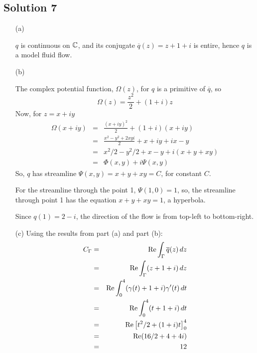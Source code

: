 \subsection*{Solution 7}

\begin{itemize}
\item[(a)]

$q$ is continuous on $\mathbb{C}$, and its conjugate
$\overline{q}(z) = z+1+i$
is entire, hence $q$ is a model fluid flow.

\item[(b)]

The complex potential function, $\Omega(z)$, for $q$ is a primitive of
$\overline{q}$, so
\[
\Omega(z) = \frac{z^2}{2}+(1+i)z
\]
Now, for $z=x+iy$
\begin{eqnarray*}
\Omega(x+iy)
	&=& \frac{ (x+iy)^2 }{ 2 } + (1+i)(x+iy) \\
	&=& \frac{ x^2-y^2 +2xyi }{2} + x + iy + ix - y \\
	&=& x^2/2 - y^2/2 + x - y + i(x + y + xy) \\
	&=& \Phi(x,y) + i\Psi(x,y)
\end{eqnarray*}
So, $q$ has streamline $\Psi(x,y)=x+y+xy=C$, for constant $C$.

For the streamline through the point 1, $\Psi(1,0) = 1$, so, the
streamline through point 1 has the equation $x+y+xy=1$, a hyperbola.



Since $q(1)=2-i$, the direction of the flow is from top-left to
bottom-right.

\item[(c)]
Using the results from part (a) and part (b):
\begin{eqnarray*}
C_\Gamma
	&=& {\rm Re} \int_\Gamma \overline{q}(z)\,dz \\
	&=& {\rm Re} \int_\Gamma (z+1+i)\,dz \\
	&=& {\rm Re} \int_0^4 (\gamma(t)+1+i)\gamma'(t)\,dt \\
	&=& {\rm Re} \int_0^4 (t+1+i)\,dt \\
	&=& {\rm Re} \left[ t^2/2+(1+i)t \right]_0^4 \\
	&=& {\rm Re} ( 16/2 +4+4i ) \\
	&=& 12
\end{eqnarray*}

\end{itemize}

